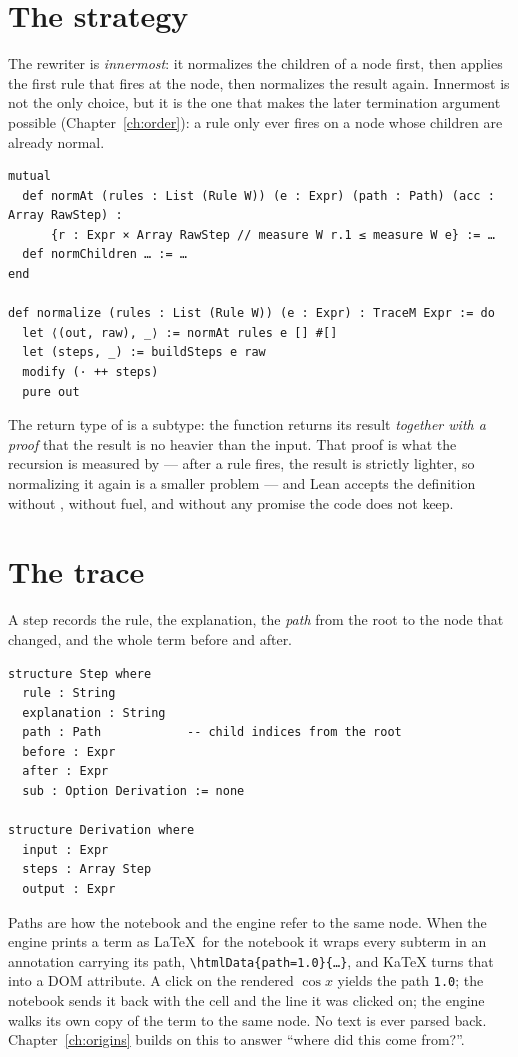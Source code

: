 \section{The strategy}

The rewriter is \emph{innermost}: it normalizes the children of a node first, then applies the
first rule that fires at the node, then normalizes the result again. Innermost is not the only
choice, but it is the one that makes the later termination argument possible
(Chapter~\ref{ch:order}): a rule only ever fires on a node whose children are already normal.

\begin{verbatim}
mutual
  def normAt (rules : List (Rule W)) (e : Expr) (path : Path) (acc : Array RawStep) :
      {r : Expr × Array RawStep // measure W r.1 ≤ measure W e} := …
  def normChildren … := …
end

def normalize (rules : List (Rule W)) (e : Expr) : TraceM Expr := do
  let ⟨(out, raw), _⟩ := normAt rules e [] #[]
  let (steps, _) := buildSteps e raw
  modify (· ++ steps)
  pure out
\end{verbatim}

The return type of  is a subtype: the function returns its result \emph{together with a
proof} that the result is no heavier than the input. That proof is what the recursion is measured
by --- after a rule fires, the result is strictly lighter, so normalizing it again is a smaller
problem --- and Lean accepts the definition without , without fuel, and without any
promise the code does not keep.

\section{The trace}

A step records the rule, the explanation, the \emph{path} from the root to the node that changed,
and the whole term before and after.

\begin{verbatim}
structure Step where
  rule : String
  explanation : String
  path : Path            -- child indices from the root
  before : Expr
  after : Expr
  sub : Option Derivation := none

structure Derivation where
  input : Expr
  steps : Array Step
  output : Expr
\end{verbatim}

Paths are how the notebook and the engine refer to the same node. When the engine prints a term as
\LaTeX\ for the notebook it wraps every subterm in an annotation carrying its path,
\verb|\htmlData{path=1.0}{…}|, and KaTeX turns that into a DOM attribute. A click on the rendered
$\cos x$ yields the path \texttt{1.0}; the notebook sends it back with the cell and the line it was
clicked on; the engine walks its own copy of the term to the same node. No text is ever parsed
back. Chapter~\ref{ch:origins} builds on this to answer ``where did this come from?''.


